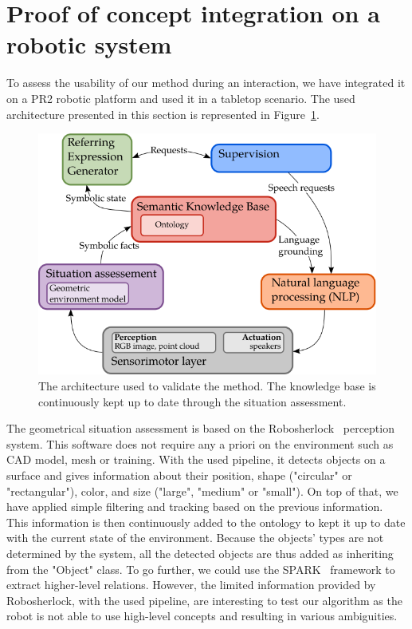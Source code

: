 \section[Integration on a robotic system]{Proof of concept integration on a robotic system}

To assess the usability of our method during an interaction, we have integrated it on a PR2 robotic platform and used it in a tabletop scenario. The used architecture presented in this section is represented in Figure~\ref{fig:chap4_archi}.

\begin{figure}[h!]
\centering
\includegraphics[scale=0.6]{figures/chapter4/architecture.png}
\caption{\label{fig:chap4_archi} The architecture used to validate the method. The knowledge base is continuously kept up to date through the situation assessment.}
\end{figure}

The geometrical situation assessment is based on the Robosherlock~\cite{beetz_2015_robosherlock} perception system. This software does not require any a priori on the environment such as CAD model, mesh or training. With the used pipeline, it detects objects on a surface and gives information about their position, shape ("circular" or "rectangular"), color, and size ("large", "medium" or "small"). On top of that, we have applied simple filtering and tracking based on the previous information. This information is then continuously added to the ontology to kept it up to date with the current state of the environment. Because the objects' types are not determined by the system, all the detected objects are thus added as inheriting from the "Object" class. To go further, we could use the SPARK~\cite{milliez_2014_framework} framework to extract higher-level relations. However, the limited information provided by Robosherlock, with the used pipeline, are interesting to test our algorithm as the robot is not able to use high-level concepts and resulting in various ambiguities.


